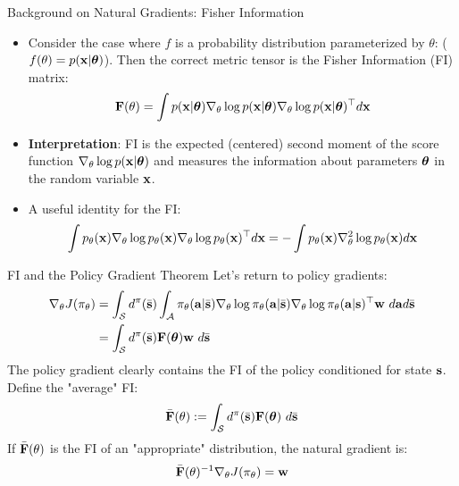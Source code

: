 \documentclass[]{beamer}
\begin{document}
\begin{frame}{Background on Natural Gradients: Fisher Information}

    \begin{itemize}
        \item Consider the case where $f$ is a probability distribution parameterized by $\theta$: ($f(\theta) = p(\vx | \vtheta)$). Then the correct metric tensor is the Fisher Information (FI) matrix:
        \begin{align*}
            \vF(\theta) = \int p(\vx | \vtheta) \nabla_\theta \log p(\vx | \vtheta) \nabla_\theta \log p(\vx | \vtheta)^\top d\vx
        \end{align*}
        \item \textbf{Interpretation}: FI is the expected (centered) second moment of the score function $\nabla_\theta \log p(\vx | \vtheta)$ and measures the information about parameters $\vtheta$ in the random variable $\vx$.
        \item A useful identity for the FI:
        \[ \int p_\theta(\vx) \nabla_\theta \log p_\theta(\vx) \nabla_\theta \log p_\theta(\vx)^\top d\vx = -\int p_\theta(\vx) \nabla^2_\theta \log p_\theta(\vx) d\vx \]
    \end{itemize}

\end{frame}

\begin{frame}{FI and the Policy Gradient Theorem}
    Let's return to policy gradients:
    \begin{align*}
        \nabla_\theta J(\pi_\theta) &= \int_\cS d^\pi(\bar \vs) \int_\cA \pi_\theta(\va | \bar \vs) \nabla_\theta \log \pi_\theta(\va | \bar \vs) \nabla_\theta \log \pi_\theta(\va | \vs)^\top \vw \ d\va d\bar \vs\\
        &= \int_\cS d^\pi(\bar \vs) \vF(\vtheta) \vw \ d\bar \vs
    \end{align*}
    The policy gradient clearly contains the FI of the policy conditioned for state $\vs$.
    Define the "average" FI:
        \[ \bar \vF(\theta) :=  \int_\cS d^\pi(\bar \vs) \vF(\vtheta) \ d\bar \vs \]
    If $\bar \vF(\theta)$ is the FI of an "appropriate" distribution, the natural gradient is:
    \[ \bar \vF(\theta)^{-1} \nabla_\theta J(\pi_\theta) = \vw \]
\end{frame}
\end{document}
